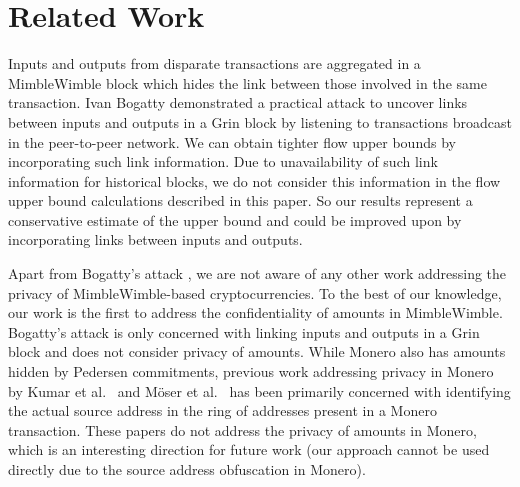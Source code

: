 \section{Related Work}
Inputs and outputs from disparate transactions are aggregated in a MimbleWimble block which hides the link between those involved in the same transaction. Ivan Bogatty \cite{Bogatty19} demonstrated a practical attack to uncover links between inputs and outputs in a Grin block by listening to transactions broadcast in the peer-to-peer network. We can obtain tighter flow upper bounds by incorporating such link information. Due to unavailability of such link information for historical blocks, we do not consider this information in the flow upper bound calculations described in this paper. So our results represent a conservative estimate of the upper bound and could be improved upon by incorporating links between inputs and outputs.

Apart from Bogatty's attack \cite{Bogatty19}, we are not aware of any other work addressing the privacy of MimbleWimble-based cryptocurrencies. To the best of our knowledge, our work is the first to address the confidentiality of amounts in MimbleWimble. Bogatty's attack is only concerned with linking inputs and outputs in a Grin block and does not consider privacy of amounts.
While Monero also has amounts hidden by Pedersen commitments, previous work addressing privacy in Monero by Kumar et al.~\cite{Kumar2017} and M\"oser et al.~\cite{Moser2018} has been primarily concerned with identifying the actual source address in the ring of addresses present in a Monero transaction. These papers do not address the privacy of amounts in Monero, which is an interesting direction for future work (our approach cannot be used directly due to the source address obfuscation in Monero).




